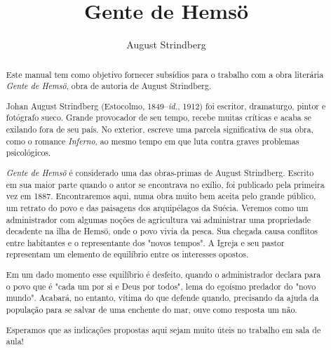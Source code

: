\documentclass[12pt]{extarticle}
\begin{document}

\newcommand{\AutorLivro}{August Strindberg}
\newcommand{\TituloLivro}{Gente de Hemsö}
\newcommand{\Tema}{Ficção, mistério e fantasia}
\newcommand{\Genero}{Romance}
\newcommand{\imagemCapa}{./images/PNLD0039-01.png}
\newcommand{\issnppub}{---}
\newcommand{\issnepub}{---}
\newcommand{\colaborador}{Bruno Gradella e Vicente Castro} 


\title{\TituloLivro}
\author{\AutorLivro}
\def\authornotes{\colaborador}

\date{}
\maketitle

\baselineskip\par

\begin{abstract}
Este manual tem como objetivo fornecer subsídios para o trabalho com a
obra literária \emph{Gente de Hemsö}, obra de autoria de August
Strindberg.

Johan August Strindberg (Estocolmo, 1849--\textit{id.}, 1912) 
foi escritor, dramaturgo, pintor e fotógrafo sueco. Grande provocador
de seu tempo, recebe muitas críticas e acaba se exilando fora de 
seu país. No exterior, escreve uma parcela significativa de sua obra,
como o romance \textit{Inferno}, ao mesmo tempo em que luta contra graves 
problemas psicológicos.

\textit{Gente de Hemsö} é considerado uma das obras-primas de August 
Strindberg. Escrito em sua maior parte quando o autor se encontrava no 
exílio, foi publicado pela primeira vez em 1887. Encontraremos aqui, 
numa obra muito bem aceita pelo grande público, um retrato do povo e das 
paisagens dos arquipélagos da Suécia. Veremos como um administrador com 
algumas noções de agricultura vai administrar uma propriedade decadente 
na ilha de Hemsö, onde o povo vivia da pesca. Sua chegada causa 
conflitos entre habitantes e o representante dos "novos tempos". A Igreja 
e seu pastor representam um elemento de equilíbrio entre os interesses 
opostos.

Em um dado momento esse equilíbrio é desfeito, quando o administrador 
declara para o povo que é "cada um por si e Deus por todos", lema do 
egoísmo predador do "novo mundo". Acabará, no entanto, vítima do que 
defende quando, precisando da ajuda da população para se salvar de uma 
enchente do mar, ouve como resposta um não.

Esperamos que as indicações propostas aqui sejam muito úteis no trabalho 
em sala de aula! 
\end{abstract}
\pagebreak
\end{document}
